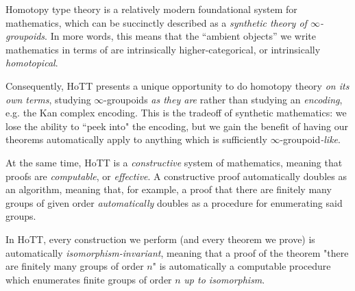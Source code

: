 \begin{node}
%
Homotopy type theory is a relatively modern
foundational system for mathematics, which can be succinctly described
as a \emph{synthetic theory of \(\infty\)-groupoids}. In more words,
this means that the ``ambient objects'' we write mathematics in terms of
are intrinsically higher-categorical, or intrinsically
\emph{homotopical}.
%
\end{node}

\begin{node}
%
Consequently, HoTT presents a unique opportunity to do homotopy theory
\emph{on its own terms}, studying \(\infty\)-groupoids \emph{as they
are} rather than studying an \emph{encoding}, e.g. the Kan complex
encoding. This is the tradeoff of synthetic mathematics: we lose the
ability to ``peek into" the encoding, but we gain the benefit of having
our theorems automatically apply to anything which is sufficiently
\(\infty\)-groupoid\emph{-like}.
%
\end{node}

\begin{node}\label{node:hott-constructive}
%
At the same time, HoTT is a \emph{constructive}
system of mathematics, meaning that proofs are \emph{computable}, or
\emph{effective}. A constructive proof automatically doubles as an
algorithm, meaning that, for example, a proof that there are finitely
many groups of given order \emph{automatically} doubles as a procedure
for enumerating said groups.
%
\end{node}

\begin{node}
%
In HoTT, every construction we perform (and every theorem we prove) is
automatically \emph{isomorphism-invariant}, meaning that a proof of the
theorem "there are finitely many groups of order \(n\)" is automatically
a computable procedure which enumerates finite groups of order \(n\)
\emph{up to isomorphism}.
%
\end{node}

